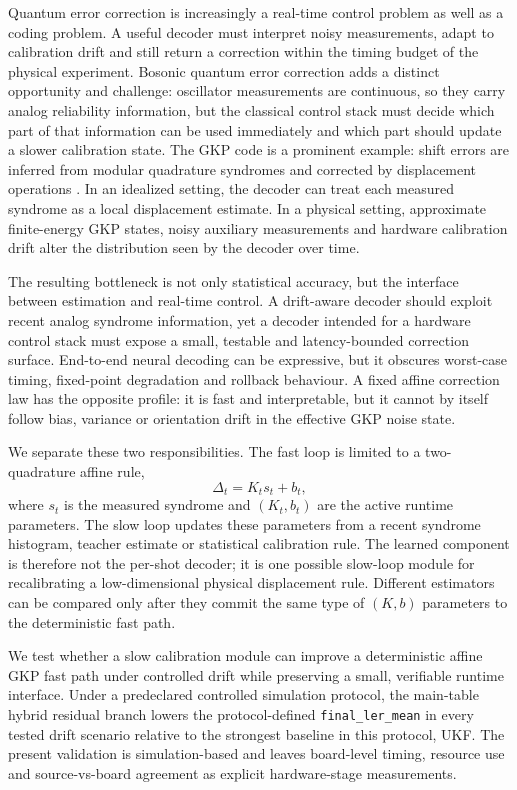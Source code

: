 \documentclass[11pt]{article}
\newcommand{\softwarehil}{controlled simulation}
\newcommand{\finalLER}{\texttt{final\_ler\_mean}}
\begin{document}
Quantum error correction is increasingly a real-time control problem as well
as a coding problem.  A useful decoder must interpret noisy measurements,
adapt to calibration drift and still return a correction within the timing
budget of the physical experiment.  Bosonic quantum error correction adds a
distinct opportunity and challenge: oscillator measurements are continuous, so
they carry analog reliability information, but the classical control stack must
decide which part of that information can be used immediately and which part
should update a slower calibration state.  The GKP code is a prominent example:
shift errors are inferred from modular quadrature syndromes and corrected by
displacement operations \cite{gkp2001,grimsmo2021}.  In an idealized setting,
the decoder can treat each measured syndrome as a local displacement estimate.
In a physical setting, approximate finite-energy GKP states, noisy auxiliary
measurements and hardware calibration drift alter the distribution seen by the
decoder over time.

The resulting bottleneck is not only statistical accuracy, but the interface
between estimation and real-time control.  A drift-aware decoder should exploit
recent analog syndrome information, yet a decoder intended for a hardware
control stack must expose a small, testable and latency-bounded correction
surface.  End-to-end neural decoding can be expressive, but it obscures
worst-case timing, fixed-point degradation and rollback behaviour.  A fixed
affine correction law has the opposite profile: it is fast
and interpretable, but it cannot by itself follow bias, variance or
orientation drift in the effective GKP noise state.

We separate these two responsibilities.  The fast loop is limited
to a two-quadrature affine rule,
\begin{equation}
    \Delta_t = K_t s_t + b_t ,
    \label{eq:fastpath}
\end{equation}
where \(s_t\) is the measured syndrome and \((K_t,b_t)\) are the active
runtime parameters.  The slow loop updates these parameters from a recent
syndrome histogram, teacher estimate or statistical calibration rule.  The
learned component is therefore not the per-shot decoder; it is one possible
slow-loop module for recalibrating a low-dimensional physical displacement
rule.  Different estimators can be compared only after they commit the same
type of \((K,b)\) parameters to the deterministic fast path.

We test whether a slow calibration module can improve a deterministic affine
GKP fast path under controlled drift while preserving a small, verifiable
runtime interface.  Under a predeclared \softwarehil{} protocol, the
main-table hybrid residual branch lowers the protocol-defined \finalLER{} in
every tested drift scenario relative to the strongest baseline in this
protocol, UKF.
The present validation is simulation-based and leaves board-level timing,
resource use and source-vs-board agreement as explicit hardware-stage
measurements.
\end{document}
